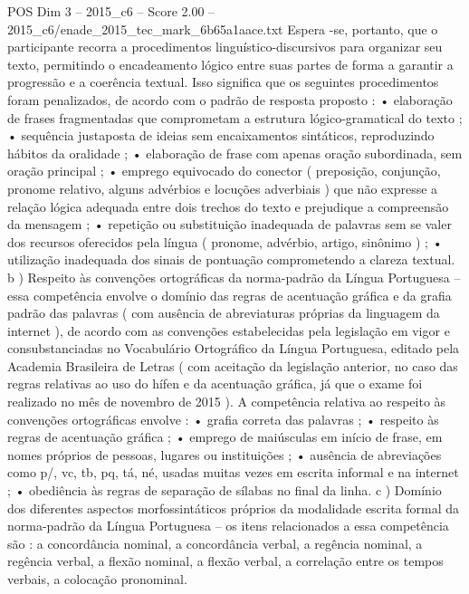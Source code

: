 \begin{textsample}{POS Dim 3 – 2015\_c6 – Score 2.00 – 2015\_c6/enade\_2015\_tec\_mark\_6b65a1aace.txt}
Espera -se, portanto, que o participante recorra a procedimentos linguístico-discursivos para organizar seu texto, permitindo o encadeamento lógico entre suas partes de forma a garantir a progressão e a coerência textual.
Isso significa que os seguintes procedimentos foram penalizados, de acordo com o padrão de resposta proposto : • elaboração de frases fragmentadas que comprometam a estrutura lógico-gramatical do texto ; • sequência justaposta de ideias sem encaixamentos sintáticos, reproduzindo hábitos da oralidade ; • elaboração de frase com apenas oração subordinada, sem oração principal ; • emprego equivocado do conector ( preposição, conjunção, pronome relativo, alguns advérbios e locuções adverbiais ) que não expresse a relação lógica adequada entre dois trechos do texto e prejudique a compreensão da mensagem ; • repetição ou substituição inadequada de palavras sem se valer dos recursos oferecidos pela língua ( pronome, advérbio, artigo, sinônimo ) ; • utilização inadequada dos sinais de pontuação comprometendo a clareza textual. b ) Respeito às convenções ortográficas da norma-padrão da Língua Portuguesa – essa competência envolve o domínio das regras de acentuação gráfica e da grafia padrão das palavras ( com ausência de abreviaturas próprias da linguagem da internet ), de acordo com as convenções estabelecidas pela legislação em vigor e consubstanciadas no Vocabulário Ortográfico da Língua Portuguesa, editado pela Academia Brasileira de Letras ( com aceitação da legislação anterior, no caso das regras relativas ao uso do hífen e da acentuação gráfica, já que o exame foi realizado no mês de novembro de 2015 ).
A competência relativa ao respeito às convenções ortográficas envolve : • grafia correta das palavras ; • respeito às regras de acentuação gráfica ; • emprego de maiúsculas em início de frase, em nomes próprios de pessoas, lugares ou instituições ; • ausência de abreviações como p/, vc, tb, pq, tá, né, usadas muitas vezes em escrita informal e na internet ; • obediência às regras de separação de sílabas no final da linha. c ) Domínio dos diferentes aspectos morfossintáticos próprios da modalidade escrita formal da norma-padrão da Língua Portuguesa – os itens relacionados a essa competência são : a concordância nominal, a concordância verbal, a regência nominal, a regência verbal, a flexão nominal, a flexão verbal, a correlação entre os tempos verbais, a colocação pronominal.

\end{textsample}
